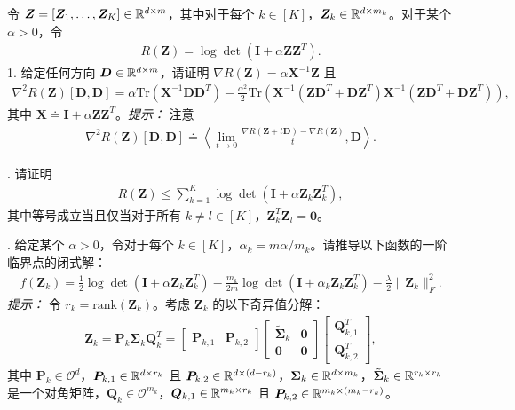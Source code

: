 \documentclass[../../book-main_zh.tex]{subfiles}
\begin{document}
\begin{exercise}
    令 $\bm Z = [\bm Z_1,\dots,\bm Z_K] \in \mathbb{R}^{d\times m}$，其中对于每个 $k \in [K]$，$\bm Z_k \in \mathbb{R}^{d\times m_k}$。对于某个 $\alpha > 0$，令
    \begin{align*}
        R(\bm Z) = \log\det\left(\bm I + \alpha\bm Z\bm Z^T \right).
    \end{align*}
1. 给定任何方向 $\bm D \in \mathbb{R}^{d\times m}$，请证明 $\nabla R(\bm Z) = \alpha\bm X^{-1}\bm Z$ 且
    \begin{align*}
 \nabla^2 R(\bm Z)[\bm D, \bm D] =\alpha \mathrm{Tr}\left( \bm X^{-1}\bm D\bm D^T\right) - \frac{\alpha^2}{2}\mathrm{Tr}\left(\bm X^{-1}\left( \bm Z\bm D^T+\bm D\bm Z^T\right) \bm X^{-1}\left( \bm Z\bm D^T+\bm D\bm Z^T\right)\right),
    \end{align*}
    其中 $\bm X \doteq \bm I + \alpha\bm Z\bm Z^T$。{\em 提示：} 注意
    \begin{align*}
        \nabla^2 R(\bm Z)[\bm D, \bm D] \doteq \left\langle \lim_{t \to 0} \frac{\nabla R(\bm Z+ t\bm D) - \nabla R(\bm Z)}{t}, \bm D \right\rangle.
    \end{align*}

. 请证明
\begin{align*}
    R(\bm Z) \le \sum_{k=1}^K \log\det\left(\bm I + \alpha\bm Z_k\bm Z_k^T \right),
\end{align*}
其中等号成立当且仅当对于所有 $k \neq l \in [K]$，$\bm Z_k^T\bm Z_l = \bm 0$。
\medskip

. 给定某个 $\alpha >0$，令对于每个 $k \in [K]$，$\alpha_k=m\alpha/m_k$。请推导以下函数的一阶临界点的闭式解：
\begin{align*}
    f(\bm Z_k) = \frac{1}{2}\log\det\left(\bm I + \alpha\bm Z_k\bm Z_k^T \right) - \frac{m_k}{2m}\log\det\left(\bm I + \alpha_k \bm Z_k\bm Z_k^T \right) - \frac{\lambda}{2}\|\bm Z_k\|_F^2.
\end{align*}
{\em 提示：} 令 $r_k=\mathrm{rank}(\bm Z_k)$。考虑 $\bm Z_k$ 的以下奇异值分解：
\begin{align*}
    \bm Z_k = \bm P_k\bm \Sigma_k\bm Q_k^T = \begin{bmatrix}
        \bm P_{k,1} & \bm P_{k,2}
    \end{bmatrix} \begin{bmatrix}
        \tilde{\bm \Sigma}_{k} & \bm 0 \\
        \bm 0 & \bm 0
    \end{bmatrix}
    \begin{bmatrix}
        \bm Q_{k,1}^T \\ \bm Q_{k,2}^T
    \end{bmatrix},
\end{align*}
其中 $\bm P_k \in \mathcal{O}^d$，$\bm P_{k,1} \in \mathbb{R}^{d\times r_k}$ 且 $\bm P_{k,2} \in \mathbb{R}^{d\times (d-r_k)}$，$\bm \Sigma_k \in \mathbb{R}^{d\times m_k}$，$\tilde{\bm \Sigma}_{k} \in \mathbb{R}^{r_k\times r_k}$ 是一个对角矩阵，$\bm Q_k \in \mathcal{O}^{m_k}$，$\bm Q_{k,1} \in \mathbb{R}^{m_k\times r_k}$ 且 $\bm P_{k,2} \in \mathbb{R}^{m_k \times (m_k-r_k)}$。
\medskip

\end{exercise}
\end{document}
